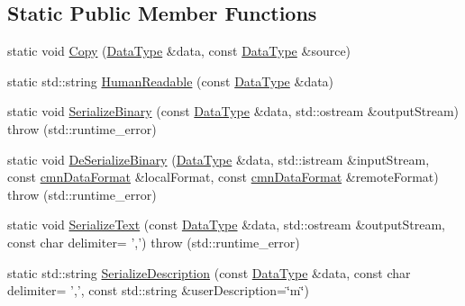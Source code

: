 \subsection*{Static Public Member Functions}
\begin{DoxyCompactItemize}
\item 
static void \hyperlink{classcmn_data_3_01vct_dynamic_matrix_3_01__element_type_01_4_01_4_aeb810ce558573cd7565f917e0602279c}{Copy} (\hyperlink{classcmn_data_3_01vct_dynamic_matrix_3_01__element_type_01_4_01_4_aac077247ac3ce4c624c4636509abe930}{Data\-Type} \&data, const \hyperlink{classcmn_data_3_01vct_dynamic_matrix_3_01__element_type_01_4_01_4_aac077247ac3ce4c624c4636509abe930}{Data\-Type} \&source)
\item 
static std\-::string \hyperlink{classcmn_data_3_01vct_dynamic_matrix_3_01__element_type_01_4_01_4_af4dcadd34973a91ea24bb8418c6e851a}{Human\-Readable} (const \hyperlink{classcmn_data_3_01vct_dynamic_matrix_3_01__element_type_01_4_01_4_aac077247ac3ce4c624c4636509abe930}{Data\-Type} \&data)
\item 
static void \hyperlink{classcmn_data_3_01vct_dynamic_matrix_3_01__element_type_01_4_01_4_a0b7d4584c6cee0d7eea2e5f63108aaa0}{Serialize\-Binary} (const \hyperlink{classcmn_data_3_01vct_dynamic_matrix_3_01__element_type_01_4_01_4_aac077247ac3ce4c624c4636509abe930}{Data\-Type} \&data, std\-::ostream \&output\-Stream)  throw (std\-::runtime\-\_\-error)
\item 
static void \hyperlink{classcmn_data_3_01vct_dynamic_matrix_3_01__element_type_01_4_01_4_af2373fc5271a0722a486f6f314482d91}{De\-Serialize\-Binary} (\hyperlink{classcmn_data_3_01vct_dynamic_matrix_3_01__element_type_01_4_01_4_aac077247ac3ce4c624c4636509abe930}{Data\-Type} \&data, std\-::istream \&input\-Stream, const \hyperlink{classcmn_data_format}{cmn\-Data\-Format} \&local\-Format, const \hyperlink{classcmn_data_format}{cmn\-Data\-Format} \&remote\-Format)  throw (std\-::runtime\-\_\-error)
\item 
static void \hyperlink{classcmn_data_3_01vct_dynamic_matrix_3_01__element_type_01_4_01_4_a9fee51b67154773978290c97509e9b68}{Serialize\-Text} (const \hyperlink{classcmn_data_3_01vct_dynamic_matrix_3_01__element_type_01_4_01_4_aac077247ac3ce4c624c4636509abe930}{Data\-Type} \&data, std\-::ostream \&output\-Stream, const char delimiter= ',')  throw (std\-::runtime\-\_\-error)
\item 
static std\-::string \hyperlink{classcmn_data_3_01vct_dynamic_matrix_3_01__element_type_01_4_01_4_af8d49011b80b2913bc4a8d713a55700a}{Serialize\-Description} (const \hyperlink{classcmn_data_3_01vct_dynamic_matrix_3_01__element_type_01_4_01_4_aac077247ac3ce4c624c4636509abe930}{Data\-Type} \&data, const char delimiter= ',', const std\-::string \&user\-Description=\char`\"{}m\char`\"{})

\end{DoxyCompactItemize}
